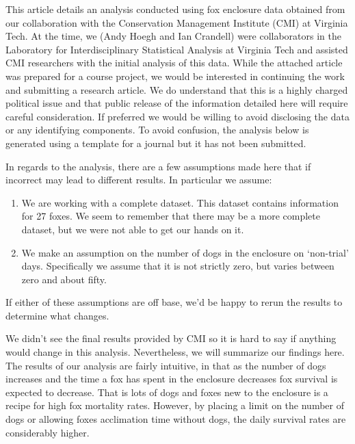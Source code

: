 \documentclass[aoas,preprint]{imsart}
\numberwithin{equation}{section}
\theoremstyle{plain}
\begin{document}
This article details an analysis conducted using fox enclosure data obtained from our collaboration with the Conservation Management Institute (CMI) at Virginia Tech. At the time, we (Andy Hoegh and Ian Crandell) were collaborators in the Laboratory for Interdisciplinary Statistical Analysis at Virginia Tech and assisted CMI researchers with the initial analysis of this data. While the attached article was prepared for a course project, we would be interested in continuing the work and submitting a research article. We do understand that this is a highly charged political issue and that public release of the information detailed here will require careful consideration. If preferred we would be willing to avoid disclosing the data or any identifying components. To avoid confusion, the analysis below is generated using a template for a journal but it has not been submitted.
 
 In regards to the analysis, there are a few assumptions made here that if incorrect may lead to different results. In particular we assume:
 \begin{enumerate}
 \item We are working with a complete dataset. This dataset contains information for 27 foxes. We seem to remember that there may be a more complete dataset, but we were not able to get our hands on it.
 \item We make an assumption on the number of dogs in the enclosure on `non-trial' days. Specifically we assume that it is not strictly zero, but varies between zero and about fifty. 
 \end{enumerate}
If either of these assumptions are off base, we'd be happy to rerun the results to determine what changes.

We didn't see the final results provided by CMI so it is hard to say if anything would change in this analysis. Nevertheless, we will summarize our findings here. The results of our analysis are fairly intuitive, in that as the number of dogs increases and the time a fox has spent in the enclosure decreases fox survival is expected to decrease. That is lots of dogs and foxes new to the enclosure is a recipe for high fox mortality rates. However, by placing a limit on the number of dogs or allowing foxes acclimation time without dogs, the daily survival rates are considerably higher.
\end{document}
